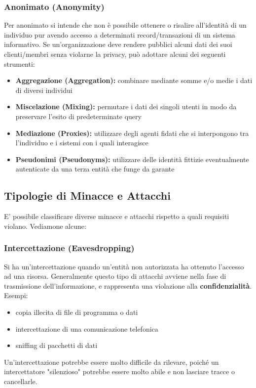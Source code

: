\subsubsection{Anonimato (Anonymity)}
Per anonimato si intende che non è possibile ottenere o risalire all'identità di un individuo pur avendo accesso a determinati record/transazioni di un sistema informativo. Se un'organizzazione deve rendere pubblici alcuni dati dei suoi clienti/membri senza violarne la privacy, può adottare alcuni dei seguenti strumenti:
\begin{itemize} 
  \item \textbf{Aggregazione (Aggregation):} combinare mediante somme e/o medie i dati di diversi individui
  \item \textbf{Miscelazione (Mixing):} permutare i dati dei singoli utenti in modo da preservare l'esito di predeterminate query
  \item \textbf{Mediazione (Proxies):} utilizzare degli agenti fidati che si interpongono tra l'individuo e i sistemi con i quali interagisce
  \item \textbf{Pseudonimi (Pseudonyms):} utilizzare delle identità fittizie eventualmente autenticate da una terza entità che funge da garante 
\end{itemize}

\subsection{Tipologie di Minacce e Attacchi}
E' possibile classificare diverse minacce e attacchi rispetto a quali requisiti violano. Vediamone alcune:

\subsubsection{Intercettazione (Eavesdropping)}
Si ha un'intercettazione quando un'entità non autorizzata ha ottenuto l'accesso ad una risorsa. Generalmente questo tipo di attacchi avviene nella fase di trasmissione dell'informazione, e rappresenta una violazione alla \textbf{confidenzialità}. Esempi:
\begin{itemize} 
  \item copia illecita di file di programma o dati
  \item intercettazione di una comunicazione telefonica
  \item sniffing di pacchetti di dati
\end{itemize}
Un'intercettazione potrebbe essere molto difficile da rilevare, poiché un intercettatore "silenzioso" potrebbe essere molto abile e non lasciare tracce o cancellarle. 


